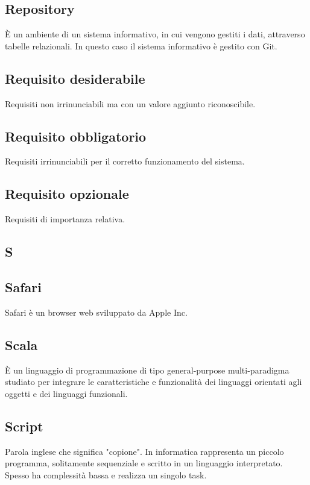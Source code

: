 \subsection*{Repository}
È un ambiente di un sistema informativo, in cui vengono gestiti i dati, attraverso
tabelle relazionali. In questo caso il sistema informativo è gestito con Git.

\subsection*{Requisito desiderabile}
Requisiti non irrinunciabili ma con un valore aggiunto riconoscibile.

\subsection*{Requisito obbligatorio}
Requisiti irrinunciabili per il corretto funzionamento del sistema.

\subsection*{Requisito opzionale}
Requisiti di importanza relativa.

\newpage

\begin{center}
\Huge\section*{\uppercase{S}}
\end{center}

\subsection*{Safari}
Safari è un browser web sviluppato da Apple Inc. 

\subsection*{Scala}
È un linguaggio di programmazione di tipo general-purpose multi-paradigma studiato per integrare le caratteristiche e funzionalità dei linguaggi orientati agli oggetti e dei linguaggi funzionali.

\subsection*{Script}
Parola inglese che significa "copione". In informatica rappresenta un piccolo
programma, solitamente sequenziale e scritto in un linguaggio interpretato.
Spesso ha complessità bassa e realizza un singolo task.


